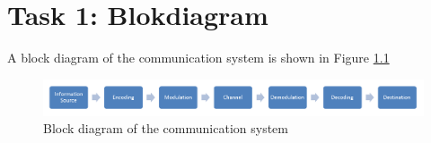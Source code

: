 \documentclass[final]{scrreprt} %
\begin{document}
\chapter{Task 1: Blokdiagram}
A block diagram of the communication system is shown in Figure \ref{fig:blok}
\begin{figure}[h]
	\includegraphics[width=\linewidth]{resources/blokdiagram.png}
	\caption{Block diagram of the communication system}
	\label{fig:blok}
\end{figure}
\end{document}
